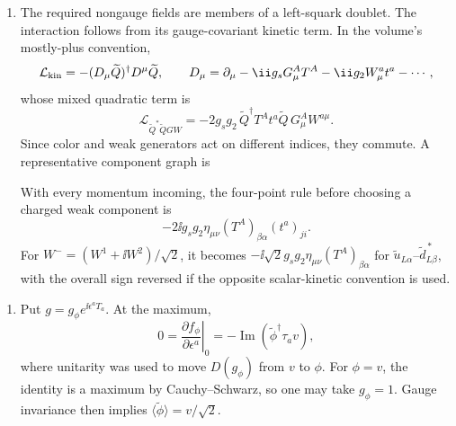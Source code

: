 \begin{enumerate}
\begin{enumerate}
    \item[(g)]
    The required nongauge fields are members of a left-squark doublet.  The
    interaction follows from its gauge-covariant kinetic term.  In the
    volume's mostly-plus convention,
    \[
      \mathcal L_{\rm kin}=-(D_\mu\widetilde Q)^\dagger
        D^\mu\widetilde Q,
      \qquad
      D_\mu=\partial_\mu-\ii g_sG_\mu^AT^A-\ii g_2W_\mu^at^a-\cdots,
    \]
    whose mixed quadratic term is
    \[
      \mathcal L_{\widetilde Q^*\widetilde QGW}
       =-2g_sg_2\,
        \widetilde Q^\dagger T^At^a\widetilde Q\,
        G_\mu^AW^{a\mu}.
      \tag{28.14.7}
    \]
    Since color and weak generators act on different indices, they commute.
    A representative component graph is
    \begin{center}
    \end{center}
    With every momentum incoming, the four-point rule before choosing a
    charged weak component is
    \[
      \boxed{-2\ii g_sg_2\eta_{\mu\nu}
        (T^A)_{\beta\alpha}(t^a)_{ji}.}
      \tag{28.14.8}
    \]
    For \(W^-=(W^1+\ii W^2)/\sqrt2\), it becomes
    \(-\ii\sqrt2g_sg_2\eta_{\mu\nu}(T^A)_{\beta\alpha}\) for
    \(\widetilde u_{L\alpha}\)--\(\widetilde d^{\,*}_{L\beta}\), with the
    overall sign reversed if the opposite scalar-kinetic convention is used.
  \end{enumerate}

  \begin{enumerate}
    \item Put \(g=g_\phi e^{\ii\epsilon^aT_a}\).  At the maximum,
      \[
        0=\left.\frac{\partial f_\phi}{\partial\epsilon^a}\right|_0
          =-\operatorname{Im}(\widetilde\phi^\dagger\tau_av),
      \]
      where unitarity was used to move \(D(g_\phi)\) from \(v\) to
      \(\phi\).  For \(\phi=v\), the identity is a maximum by
      Cauchy--Schwarz, so one may take \(g_\phi=1\).  Gauge invariance then
      implies \(\langle\widetilde\phi\rangle=v/\sqrt2\).


\end{enumerate}
\end{enumerate}
